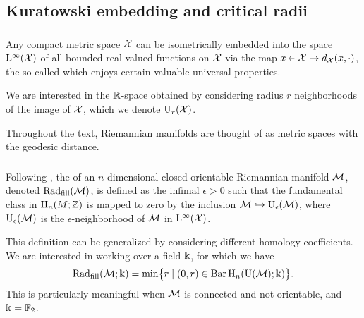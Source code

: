 

\subsection{Kuratowski embedding and critical radii}\label{sub:filling radii}

\subsubsection{}

Any compact metric space $\cX$ can be isometrically embedded into the space $\rL^\infty(\cX)$ of all bounded real-valued functions on $\cX$ via the map $x \in \cX \mapsto d_\cX(x,\cdot)$, the so-called  which enjoys certain valuable universal properties.

We are interested in the \(\R\)-space obtained by considering radius \(r\) neighborhoods of the image of \(\cX\), which we denote \(\rU_r(\cX)\).

Throughout the text, Riemannian manifolds are thought of as metric spaces with the geodesic distance.

\subsubsection{}

Following \cite{gromov1983filling}, the  of an \(n\)-dimensional closed orientable Riemannian manifold $\cM$, denoted \(\fillrad(\cM)\), is defined as the infimal $\epsilon > 0$ such that the fundamental class in $\rH_n(M; \Z)$ is mapped to zero by the inclusion $\cM \hookrightarrow \rU_\epsilon(\cM)$, where \(\rU_\epsilon(\cM)\) is the \(\epsilon\)-neighborhood of \(\cM\) in \(\rL^\infty(\cX)\).

This definition can be generalized by considering different homology coefficients.
We are interested in working over a field \(\k\), for which we have
\[
\fillrad(\cM; \field) = \min\set[\big]{r \mid (0, r) \in \barc \rH_n(\rU(\cM); \field)}.
\]
This is particularly meaningful when \(\cM\) is connected and not orientable, and \(\k = \Ftwo\).

